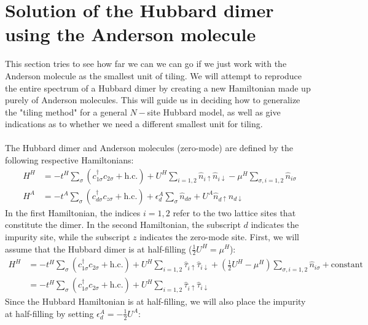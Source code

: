 \documentclass{article}
\numberwithin{equation}{section}
\begin{document}
\section{Solution of the Hubbard dimer using the Anderson molecule}
This section tries to see how far we can we can go if we just work with the Anderson molecule as the smallest unit of tiling. We will attempt to reproduce the entire spectrum of a Hubbard dimer by creating a new Hamiltonian made up purely of Anderson molecules. This will guide us in deciding how to generalize the "tiling method" for a general $N-$site Hubbard model, as well as give indications as to whether we need a different smallest unit for tiling.
\\\\
The Hubbard dimer and Anderson molecules (zero-mode) are defined by the following respective Hamiltonians:
\begin{equation}\begin{aligned}
	H^H &= -t^H\sum_{\sigma}\left(c^\dagger_{1\sigma}c_{2\sigma} + \text{h.c.}\right) + U^H\sum_{i=1,2}\hat n_{i \uparrow}\hat n_{i \downarrow} - \mu^H \sum_{\sigma, i=1,2}\hat n_{i\sigma}\\
	H^A &= -t^A\sum_{\sigma}\left(c^\dagger_{d\sigma}c_{z\sigma} + \text{h.c.}\right) + \epsilon_d^A \sum_{\sigma}\hat n_{d\sigma} + U^A\hat n_{d \uparrow}\hat n_{d \downarrow}
\end{aligned}\end{equation}
In the first Hamiltonian, the indices \(i=1,2\) refer to the two lattice sites that constitute the dimer. In the second Hamiltonian, the subscript \(d\) indicates the impurity site, while the subscript \(z\) indicates the zero-mode site. First, we will assume that the Hubbard dimer is at half-filling (\(\frac{1}{2}U^H = \mu^H\)):
\begin{equation}\begin{aligned}
	\label{hubb_dimer}
	H^H &= -t^H\sum_{\sigma}\left(c^\dagger_{1\sigma}c_{2\sigma} + \text{h.c.}\right) + U^H\sum_{i=1,2}\hat \tau_{i \uparrow}\hat \tau_{i \downarrow} + \left(\frac{1}{2}U^H- \mu^H\right) \sum_{\sigma, i=1,2}\hat n_{i\sigma} + \text{constant}\\
	    &= -t^H\sum_{\sigma}\left(c^\dagger_{1\sigma}c_{2\sigma} + \text{h.c.}\right) + U^H\sum_{i=1,2}\hat \tau_{i \uparrow}\hat \tau_{i \downarrow}
\end{aligned}\end{equation}
Since the Hubbard Hamiltonian is at half-filling, we will also place the impurity at half-filling by setting \(\epsilon_d^A = -\frac{1}{2}U^A\):
\end{document}
